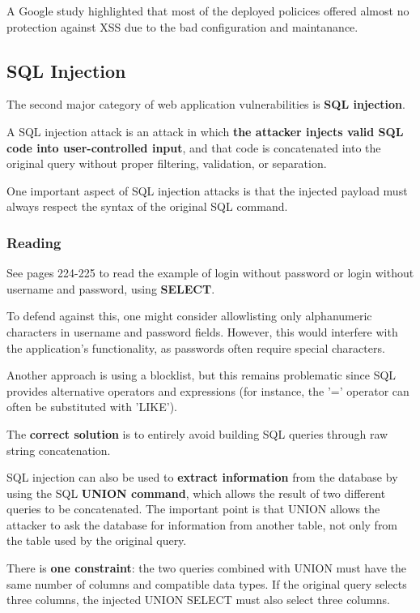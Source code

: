 \documentclass{article}
\begin{document}
A Google study highlighted that most of the deployed policices offered almost no protection against XSS due to the bad configuration and maintanance.

\subsection{SQL Injection}

The second major category of web application vulnerabilities is \textbf{SQL injection}.

A SQL injection attack is an attack in which \textbf{the attacker injects valid SQL code into user-controlled input}, and that code is concatenated into the original query without proper filtering, validation, or separation.

One important aspect of SQL injection attacks is that the injected payload must always respect the syntax of the original SQL command.

\subsubsection{Reading}

See pages 224-225 to read the example of login without password or login without username and password, using \textbf{SELECT}.

To defend against this, one might consider allowlisting only alphanumeric characters in username and password fields. However, this would interfere with the application's functionality, as passwords often require special characters.

Another approach is using a blocklist, but this remains problematic since SQL provides alternative operators and expressions (for instance, the '=' operator can often be substituted with 'LIKE').

The \textbf{correct solution} is to entirely avoid building SQL queries through raw string concatenation.

SQL injection can also be used to \textbf{extract information} from the database by using the SQL \textbf{UNION command}, which allows the result of two different queries to be concatenated. The important point is that UNION allows the attacker to ask the database for information from another table, not only from the table used by the original query.

There is \textbf{one constraint}: the two queries combined with UNION must have the same number of columns and compatible data types. If the original query selects three columns, the injected UNION SELECT must also select three columns.
\end{document}
